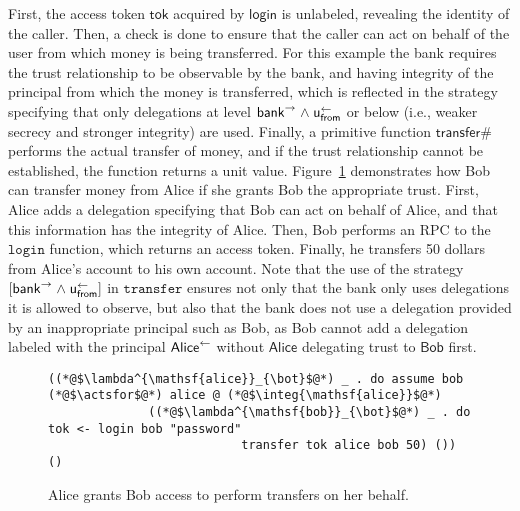 First, the access token $\mathsf{tok}$ acquired by $\mathsf{login}$ is unlabeled, revealing the identity of the caller. Then, a check is done to ensure that the caller can act on behalf of the user from which money is being transferred. For this example the bank requires the trust relationship to be observable by the bank, and having integrity of the principal from which the money is transferred, which is reflected in the strategy specifying that only delegations at level $\mathsf{bank}^{\rightarrow} \mathrel{\land} \mathsf{u}_{\mathsf{from}}^{\leftarrow}$ or below (i.e., weaker secrecy and stronger integrity) are used. Finally, a primitive function $\mathsf{transfer\#}$ performs the actual transfer of money, and if the trust relationship cannot be established, the function returns a unit value. Figure~\ref{fig:bob-transfer-from-alice} demonstrates how Bob can transfer money from Alice if she grants Bob the appropriate trust. First, Alice adds a delegation specifying that Bob can act on behalf of Alice, and that this information has the integrity of Alice. Then, Bob performs an RPC to the $\mathtt{login}$ function, which returns an access token. Finally, he transfers 50 dollars from Alice's account to his own account. Note that the use of the strategy $[\mathsf{bank}^{\rightarrow} \mathrel{\land} \mathsf{u}_{\mathsf{from}}^{\leftarrow}]$ in $\mathtt{transfer}$ ensures not only that the bank only uses delegations it is allowed to observe, but also that the bank does not use a delegation provided by an inappropriate principal such as Bob, as Bob cannot add a delegation labeled with the principal $\mathsf{Alice}^{\leftarrow}$ without $\mathsf{Alice}$ delegating trust to $\mathsf{Bob}$ first.

\begin{figure}
\centering
\begin{lstlisting}
((*@$\lambda^{\mathsf{alice}}_{\bot}$@*) _ . do assume bob (*@$\actsfor$@*) alice @ (*@$\integ{\mathsf{alice}}$@*)
              ((*@$\lambda^{\mathsf{bob}}_{\bot}$@*) _ . do tok <- login bob "password"
                           transfer tok alice bob 50) ()) ()
\end{lstlisting}
\caption{Alice grants Bob access to perform transfers on her behalf.}
\label{fig:bob-transfer-from-alice}
\end{figure}
